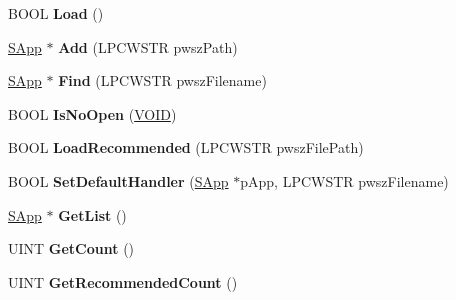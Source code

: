 \begin{DoxyCompactItemize}
\item 
\mbox{\label{class_c_open_with_list_ab07462abae6643b39d3a863de2064440}} 
B\+O\+OL {\bfseries Load} ()
\item 
\mbox{\label{class_c_open_with_list_a73ade66d6e1e1d784342b2bb7fdce03d}} 
\hyperlink{struct_c_open_with_list_1_1_s_app}{S\+App} $\ast$ {\bfseries Add} (L\+P\+C\+W\+S\+TR pwsz\+Path)
\item 
\mbox{\label{class_c_open_with_list_a15e7e374cad6d5be5539e174ed359df6}} 
\hyperlink{struct_c_open_with_list_1_1_s_app}{S\+App} $\ast$ {\bfseries Find} (L\+P\+C\+W\+S\+TR pwsz\+Filename)
\item 
\mbox{\label{class_c_open_with_list_a3401b66e3aefc614fdfd9438eb21c514}} 
B\+O\+OL {\bfseries Is\+No\+Open} (\hyperlink{interfacevoid}{V\+O\+ID})
\item 
\mbox{\label{class_c_open_with_list_a1c5f16f7c1ab70fc085583c4709650c8}} 
B\+O\+OL {\bfseries Load\+Recommended} (L\+P\+C\+W\+S\+TR pwsz\+File\+Path)
\item 
\mbox{\label{class_c_open_with_list_a8e3164292cbb3b7f16db6c0dcb85e79c}} 
B\+O\+OL {\bfseries Set\+Default\+Handler} (\hyperlink{struct_c_open_with_list_1_1_s_app}{S\+App} $\ast$p\+App, L\+P\+C\+W\+S\+TR pwsz\+Filename)
\item 
\mbox{\label{class_c_open_with_list_a51cd46dddd3edaf951c31d27d5f766c7}} 
\hyperlink{struct_c_open_with_list_1_1_s_app}{S\+App} $\ast$ {\bfseries Get\+List} ()
\item 
\mbox{\label{class_c_open_with_list_a2f8b807f1c64e85113104e3581d8ce1b}} 
U\+I\+NT {\bfseries Get\+Count} ()
\item 
\mbox{\label{class_c_open_with_list_a60f3f2cb7520da8f97f7a8c66c5782d3}} 
U\+I\+NT {\bfseries Get\+Recommended\+Count} ()
\end{DoxyCompactItemize}
